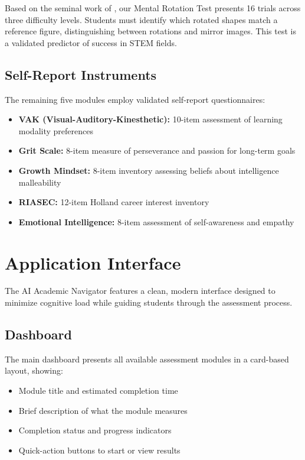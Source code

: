 \documentclass[11pt,a4paper]{article}
\begin{document}
Based on the seminal work of \citet{shepard1971}, our Mental Rotation Test presents 16 trials across three difficulty levels. Students must identify which rotated shapes match a reference figure, distinguishing between rotations and mirror images. This test is a validated predictor of success in STEM fields.

\subsection{Self-Report Instruments}

The remaining five modules employ validated self-report questionnaires:

\begin{itemize}[noitemsep]
    \item \textbf{VAK (Visual-Auditory-Kinesthetic):} 10-item assessment of learning modality preferences
    \item \textbf{Grit Scale:} 8-item measure of perseverance and passion for long-term goals
    \item \textbf{Growth Mindset:} 8-item inventory assessing beliefs about intelligence malleability
    \item \textbf{RIASEC:} 12-item Holland career interest inventory
    \item \textbf{Emotional Intelligence:} 8-item assessment of self-awareness and empathy
\end{itemize}

\section{Application Interface}

The AI Academic Navigator features a clean, modern interface designed to minimize cognitive load while guiding students through the assessment process.

\subsection{Dashboard}

The main dashboard presents all available assessment modules in a card-based layout, showing:
\begin{itemize}[noitemsep]
    \item Module title and estimated completion time
    \item Brief description of what the module measures
    \item Completion status and progress indicators
    \item Quick-action buttons to start or view results
\end{itemize}
\end{document}
